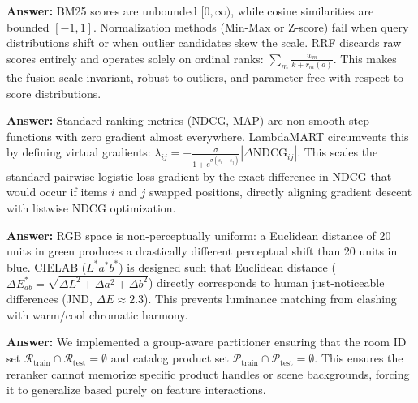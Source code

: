 \documentclass[11pt,a4paper]{article}
\begin{document}
\begin{tcolorbox}[colback=BoxBg, colframe=SlateDark, arc=2mm, title=\textbf{Q2: How does Reciprocal Rank Fusion solve score calibration across modalities?}]
\textbf{Answer:} BM25 scores are unbounded $[0, \infty)$, while cosine similarities are bounded $[-1, 1]$. Normalization methods (Min-Max or Z-score) fail when query distributions shift or when outlier candidates skew the scale. RRF discards raw scores entirely and operates solely on ordinal ranks: $\sum_m \frac{w_m}{k + r_m(d)}$. This makes the fusion scale-invariant, robust to outliers, and parameter-free with respect to score distributions.
\end{tcolorbox}

\begin{tcolorbox}[colback=BoxBg, colframe=SlateDark, arc=2mm, title=\textbf{Q3: Explain the mathematical significance of the $\lambda$-gradient in LambdaMART.}]
\textbf{Answer:} Standard ranking metrics (NDCG, MAP) are non-smooth step functions with zero gradient almost everywhere. LambdaMART circumvents this by defining virtual gradients: $\lambda_{ij} = -\frac{\sigma}{1 + e^{\sigma(s_i - s_j)}} |\Delta \text{NDCG}_{ij}|$. This scales the standard pairwise logistic loss gradient by the exact difference in NDCG that would occur if items $i$ and $j$ swapped positions, directly aligning gradient descent with listwise NDCG optimization.
\end{tcolorbox}

\begin{tcolorbox}[colback=BoxBg, colframe=SlateDark, arc=2mm, title=\textbf{Q4: What is the CIELAB color space and why use $\Delta E^*_{ab}$ over RGB Euclidean distance?}]
\textbf{Answer:} RGB space is non-perceptually uniform: a Euclidean distance of 20 units in green produces a drastically different perceptual shift than 20 units in blue. CIELAB ($L^*a^*b^*$) is designed such that Euclidean distance ($\Delta E^*_{ab} = \sqrt{\Delta L^2 + \Delta a^2 + \Delta b^2}$) directly corresponds to human just-noticeable differences (JND, $\Delta E \approx 2.3$). This prevents luminance matching from clashing with warm/cool chromatic harmony.
\end{tcolorbox}

\begin{tcolorbox}[colback=BoxBg, colframe=SlateDark, arc=2mm, title=\textbf{Q5: How did you mathematically guarantee zero data leakage between splits?}]
\textbf{Answer:} We implemented a group-aware partitioner ensuring that the room ID set $\mathcal{R}_{\text{train}} \cap \mathcal{R}_{\text{test}} = \emptyset$ and catalog product set $\mathcal{P}_{\text{train}} \cap \mathcal{P}_{\text{test}} = \emptyset$. This ensures the reranker cannot memorize specific product handles or scene backgrounds, forcing it to generalize based purely on feature interactions.
\end{tcolorbox}
\end{document}

